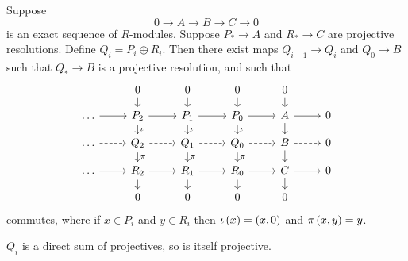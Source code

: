 \begin{proposition}
Suppose
$$ 0 \to A \to B \to C \to 0 $$
is an exact sequence of $ R $-modules. Suppose $ P_* \to A $ and $ R_* \to C $ are projective resolutions. Define $ Q_i = P_i \oplus R_i $. Then there exist maps $ Q_{i + 1} \to Q_i $ and $ Q_0 \to B $ such that $ Q_* \to B $ is a projective resolution, and such that
$$
\begin{tikzcd}[row sep=small]
& 0 \arrow{d} & 0 \arrow{d} & 0 \arrow{d} & 0 \arrow{d} & \\
\dots \arrow{r} & P_2 \arrow{r} \arrow{d}{\iota} & P_1 \arrow{r} \arrow{d}{\iota} & P_0 \arrow{r} \arrow{d}{\iota} & A \arrow{r} \arrow{d} & 0 \\
\dots \arrow[dashed]{r} & Q_2 \arrow[dashed]{r} \arrow{d}{\pi} & Q_1 \arrow[dashed]{r} \arrow{d}{\pi} & Q_0 \arrow[dashed]{r} \arrow{d}{\pi} & B \arrow[dashed]{r} \arrow{d} & 0 \\
\dots \arrow{r} & R_2 \arrow{r} \arrow{d} & R_1 \arrow{r} \arrow{d} & R_0 \arrow{r} \arrow{d} & C \arrow{r} \arrow{d} & 0 \\
& 0 & 0 & 0 & 0 &
\end{tikzcd}
$$
commutes, where if $ x \in P_i $ and $ y \in R_i $ then $ \iota\br{x} = \br{x, 0} $ and $ \pi\br{x, y} = y $.
\end{proposition}

\begin{note*}
$ Q_i $ is a direct sum of projectives, so is itself projective.
\end{note*}

\pagebreak

